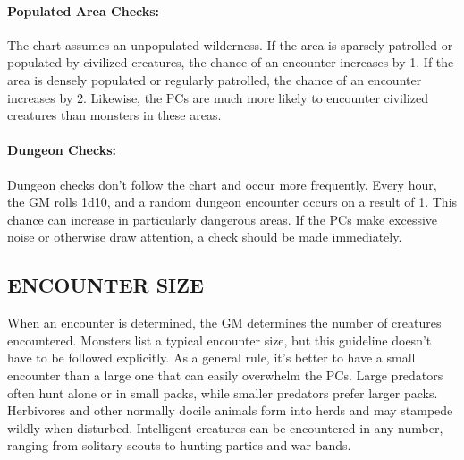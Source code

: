 \begin{multicols}{2}
\paragraph{Populated Area Checks:} The chart assumes an unpopulated wilderness.  If the area is sparsely patrolled or populated by civilized creatures, the chance of an encounter increases by 1.  If the area is densely populated or regularly patrolled, the chance of an encounter increases by 2.  Likewise, the PCs are much more likely to encounter civilized creatures than monsters in these areas.

\paragraph{Dungeon Checks:} Dungeon checks don't follow the chart and occur more frequently.  Every hour, the GM rolls 1d10, and a random dungeon encounter occurs on a result of 1.  This chance can increase in particularly dangerous areas.  If the PCs make excessive noise or otherwise draw attention, a check should be made immediately.

\subsection{ENCOUNTER SIZE}

When an encounter is determined, the GM determines the number of creatures encountered.  Monsters list a typical encounter size, but this guideline doesn't have to be followed explicitly.  As a general rule, it's better to have a small encounter than a large one that can easily overwhelm the PCs.  Large predators often hunt alone or in small packs, while smaller predators prefer larger packs.  Herbivores and other normally docile animals form into herds and may stampede wildly when disturbed.  Intelligent creatures can be encountered in any number, ranging from solitary scouts to hunting parties and war bands.

\end{multicols}

